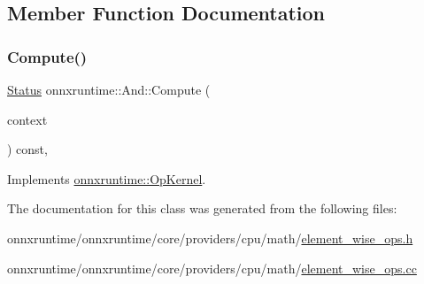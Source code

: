 \subsection{Member Function Documentation}
\mbox{\label{classonnxruntime_1_1And_a4d9213701e71e8e4e17255160b936350}} 
\subsubsection{\texorpdfstring{Compute()}{Compute()}}
{\footnotesize\ttfamily \mbox{\hyperlink{classonnxruntime_1_1common_1_1Status}{Status}} onnxruntime\+::\+And\+::\+Compute (\begin{DoxyParamCaption}\item[{\mbox{\hyperlink{classonnxruntime_1_1OpKernelContext}{Op\+Kernel\+Context}} $\ast$}]{context }\end{DoxyParamCaption}) const\hspace{0.3cm}{\ttfamily [override]}, {\ttfamily [virtual]}}



Implements \mbox{\hyperlink{classonnxruntime_1_1OpKernel_a9eca8656a78b1b3ab9d3351a12798650}{onnxruntime\+::\+Op\+Kernel}}.



The documentation for this class was generated from the following files\+:\begin{DoxyCompactItemize}
\item 
onnxruntime/onnxruntime/core/providers/cpu/math/\mbox{\hyperlink{element__wise__ops_8h}{element\+\_\+wise\+\_\+ops.\+h}}\item 
onnxruntime/onnxruntime/core/providers/cpu/math/\mbox{\hyperlink{element__wise__ops_8cc}{element\+\_\+wise\+\_\+ops.\+cc}}\end{DoxyCompactItemize}
